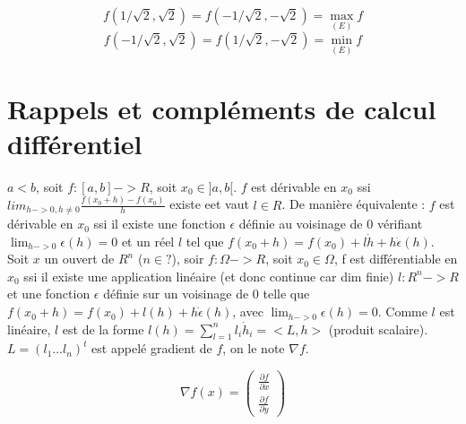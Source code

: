 		\[f(1/ \sqrt{2}, \sqrt{2}) = f(-1/ \sqrt{2}, -\sqrt{2}) = \max_{(E)} f\]
		\[f(-1/ \sqrt{2}, \sqrt{2}) = f(1/ \sqrt{2}, -\sqrt{2}) = \min_{(E)} f\]
		
	\section{Rappels et compléments de calcul différentiel}
	
	$a<b$, soit $f:[a, b]->R$, soit $x_0 \in ]a, b[$.
	$f$ est dérivable en $x_0$ ssi $lim_{h->0, h\neq 0} \frac{ f(x_0+h)-f(x_0) }{ h }$ existe eet vaut $l \in R$.
	De manière équivalente : $f$ est dérivable en $x_0$ ssi il existe une fonction $\epsilon$ définie au voisinage de $0$ vérifiant $\lim_{h->0} \epsilon (h) = 0$ et un réel $l$ tel que $f(x_0+h) = f(x_0)+l\dot h + h \dot \epsilon (h)$.
	Soit $x$ un ouvert de $R^n$ ($n \in ?$), soir $f:\Omega ->R$, soit $x_0 \in \Omega$, f est différentiable en $x_0$ ssi il existe une application linéaire (et donc continue car dim finie) $l:R^n->R$ et une fonction $\epsilon$ définie sur un voisinage de $0$ telle que $f(x_0+h) = f(x_0)+l(h) + h \dot \epsilon (h)$, avec $\lim_{h->0} \epsilon (h) = 0$.
	Comme $l$ est linéaire, $l$ est de la forme $l(h) = \sum _{l=1}^n l_i \dot h_i = <L,h>$ (produit scalaire). 
	$L= ( l_1 \dots l_n )^t$ 
	est appelé gradient de $f$, on le note $\nabla f$.
	
	\[\nabla f(x) = \left( \begin{array}{c} \frac{\partial f}{\partial x} \\ \frac{\partial f}{\partial y} \end{array}\right)\]
	
